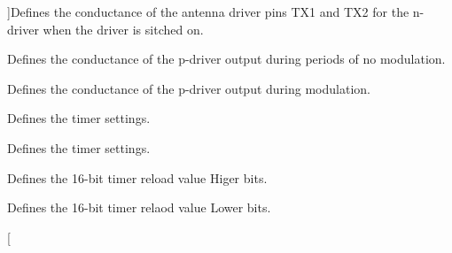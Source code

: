 \begin{Desc}
\begin{description}
{}]Defines the conductance of the antenna driver pins T\+X1 and T\+X2 for the n-\/driver when the driver is sitched on. \item[{\em 
C\+W\+Gs\+P\+Reg\hypertarget{class_r_c522_a7bf90c1bc00e047a687a30948f18a431a490ac2ae01c21e11e5179a310a62dc5f}{}\label{class_r_c522_a7bf90c1bc00e047a687a30948f18a431a490ac2ae01c21e11e5179a310a62dc5f}
}]Defines the conductance of the p-\/driver output during periods of no modulation. \item[{\em 
Mod\+Gs\+P\+Reg\hypertarget{class_r_c522_a7bf90c1bc00e047a687a30948f18a431aa92f706ed8fef333b4c27e7a42ae352f}{}\label{class_r_c522_a7bf90c1bc00e047a687a30948f18a431aa92f706ed8fef333b4c27e7a42ae352f}
}]Defines the conductance of the p-\/driver output during modulation. \item[{\em 
Tmode\+Reg\hypertarget{class_r_c522_a7bf90c1bc00e047a687a30948f18a431ada66ccec6aaeb51563fa663e70c624de}{}\label{class_r_c522_a7bf90c1bc00e047a687a30948f18a431ada66ccec6aaeb51563fa663e70c624de}
}]Defines the timer settings. \item[{\em 
T\+Prescaler\+Reg\hypertarget{class_r_c522_a7bf90c1bc00e047a687a30948f18a431a237cdeaf894c23f3b97eccb8b1bb1479}{}\label{class_r_c522_a7bf90c1bc00e047a687a30948f18a431a237cdeaf894c23f3b97eccb8b1bb1479}
}]Defines the timer settings. \item[{\em 
T\+Reload\+RegH\hypertarget{class_r_c522_a7bf90c1bc00e047a687a30948f18a431acd32b2f19f1ff8fa06c27e80905889db}{}\label{class_r_c522_a7bf90c1bc00e047a687a30948f18a431acd32b2f19f1ff8fa06c27e80905889db}
}]Defines the 16-\/bit timer reload value Higer bits. \item[{\em 
Treload\+RegL\hypertarget{class_r_c522_a7bf90c1bc00e047a687a30948f18a431a826b0794c3eb52306f986d77c33cefc3}{}\label{class_r_c522_a7bf90c1bc00e047a687a30948f18a431a826b0794c3eb52306f986d77c33cefc3}
}]Defines the 16-\/bit timer relaod value Lower bits. \item[{\em 
}
\end{description}
\end{Desc}
